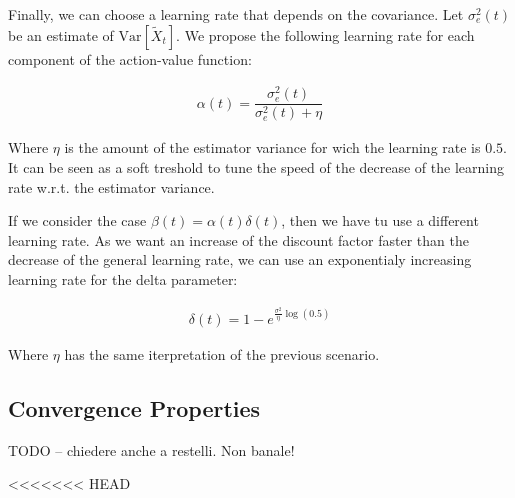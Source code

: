 \documentclass[conference]{IEEEtran}
\begin{document}
Finally, we can choose a learning rate that depends on the covariance. Let $\sigma_e^2(t)$ be an estimate of $\mathrm{Var}\left[\widetilde{X}_{t}\right]$. We propose the following learning rate for each component of the action-value function:

\begin{align}
 \alpha(t)=\dfrac{\sigma_e^2(t)}{\sigma_e^2(t)+\eta}
\end{align}

Where $\eta$ is the amount of the estimator variance for wich the learning rate is $0.5$. It can be seen as a soft treshold to tune the speed of the decrease of the learning rate w.r.t. the estimator variance.

If we consider the case $\beta(t)=\alpha(t)\delta(t)$, then we have tu use a different learning rate. As we want an increase of the discount factor faster than the decrease of the general learning rate, we can use an exponentialy increasing learning rate for the delta parameter:

\begin{align}
 \delta(t) = 1- e^{\frac{\sigma^2}{\eta}\log(0.5)}
\end{align}

Where $\eta$ has the same iterpretation of the previous scenario.


\subsection{Convergence Properties}

TODO -- chiedere anche a restelli. Non banale!

<<<<<<< HEAD
\end{document}
